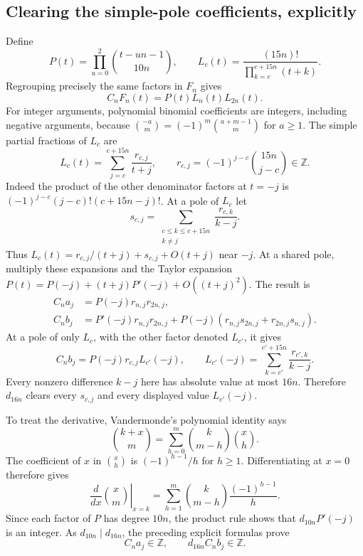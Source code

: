 \documentclass[11pt]{article}
\newcommand{\Z}{\mathbb Z}
\begin{document}
\subsection{Clearing the simple-pole coefficients, explicitly}
Define
\[
 P(t)=\prod_{u=0}^2\binom{t-un-1}{10n},\qquad
 L_c(t)=\frac{(15n)!}{\prod_{k=c}^{c+15n}(t+k)}.
\]
Regrouping precisely the same factors in $F_n$ gives
\begin{equation}\label{arith-reference-factorization}
 C_nF_n(t)=P(t)L_n(t)L_{2n}(t).
\end{equation}
For integer arguments, polynomial binomial coefficients are integers,
including negative arguments, because
$\binom{-a}{m}=(-1)^m\binom{a+m-1}{m}$ for $a\geq1$.
The simple partial fractions of $L_c$ are
\[
 L_c(t)=\sum_{j=c}^{c+15n}\frac{r_{c,j}}{t+j},\qquad
 r_{c,j}=(-1)^{j-c}\binom{15n}{j-c}\in\Z.
\]
Indeed the product of the other denominator factors at $t=-j$ is
$(-1)^{j-c}(j-c)!(c+15n-j)!$.
At a pole of $L_c$ let
\[
 s_{c,j}=\sum_{\substack{c\leq k\leq c+15n\\k\ne j}}
             \frac{r_{c,k}}{k-j}.
\]
Thus $L_c(t)=r_{c,j}/(t+j)+s_{c,j}+O(t+j)$ near $-j$.
At a shared pole, multiply these expansions and the Taylor expansion
$P(t)=P(-j)+(t+j)P'(-j)+O((t+j)^2)$. The result is
\begin{align*}
 C_na_j&=P(-j)r_{n,j}r_{2n,j},\\
 C_nb_j&=P'(-j)r_{n,j}r_{2n,j}
       +P(-j)(r_{n,j}s_{2n,j}+r_{2n,j}s_{n,j}).
\end{align*}
At a pole of only $L_c$, with the other factor denoted $L_{c'}$, it gives
\[
 C_nb_j=P(-j)r_{c,j}L_{c'}(-j),\qquad
 L_{c'}(-j)=\sum_{k=c'}^{c'+15n}\frac{r_{c',k}}{k-j}.
\]
Every nonzero difference $k-j$ here has absolute value at most $16n$.
Therefore $d_{16n}$ clears every $s_{c,j}$ and every displayed value
$L_{c'}(-j)$.

To treat the derivative, Vandermonde's polynomial identity says
\[
 \binom{k+x}{m}=\sum_{h=0}^{m}\binom{k}{m-h}\binom{x}{h}.
\]
The coefficient of $x$ in $\binom{x}{h}$ is $(-1)^{h-1}/h$ for $h\geq1$.
Differentiating at $x=0$ therefore gives
\[
 \left.\frac{d}{dx}\binom{x}{m}\right|_{x=k}
 =\sum_{h=1}^{m}\binom{k}{m-h}\frac{(-1)^{h-1}}h.
\]
Since each factor of $P$ has degree $10n$, the product rule shows that
$d_{10n}P'(-j)$ is an integer. As $d_{10n}\mid d_{16n}$, the preceding
explicit formulas prove
\[
 C_na_j\in\Z,\qquad d_{16n}C_nb_j\in\Z.
\]
\end{document}
